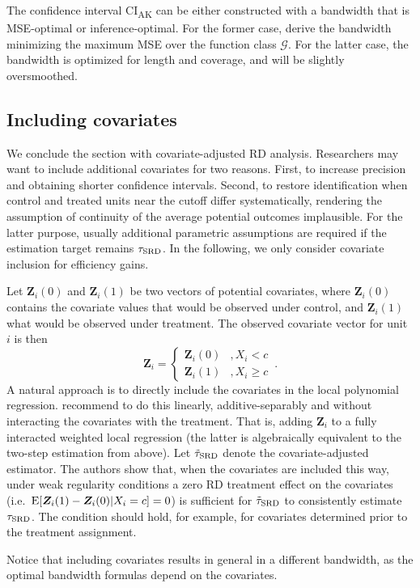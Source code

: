 The confidence interval CI\textsubscript{AK} can be either constructed with a bandwidth that is MSE-optimal or inference-optimal.
For the former case, \textcite{Armstrong_2020} derive the bandwidth minimizing the maximum MSE over the function class $\mathcal{G}$.
For the latter case, the bandwidth is optimized for length and coverage, and will be slightly oversmoothed.

\subsection{Including covariates}

We conclude the section with covariate-adjusted RD analysis.
Researchers may want to include additional covariates for two reasons.
First, to increase precision and obtaining shorter confidence intervals.
Second, to restore identification when control and treated units near the cutoff differ systematically,
rendering the assumption of continuity of the average potential outcomes implausible.
For the latter purpose, usually additional parametric assumptions are required if the estimation target remains $\tau_{\textup{SRD}}$.
In the following, we only consider covariate inclusion for efficiency gains.

Let $\bm{Z}_i(0)$ and $\bm{Z}_i(1)$ be two vectors of potential covariates,
where $\bm{Z}_i(0)$ contains the covariate values that would be observed under control, and $\bm{Z}_i(1)$ what would be observed under treatment.
The observed covariate vector for unit $i$ is then
\begin{equation}
	\bm{Z}_i = \begin{cases} 
		\bm{Z}_i(0) & , X_i < c \\
		\bm{Z}_i(1) & , X_i \geq c
	\end{cases} \,.
\end{equation}
A natural approach is to directly include the covariates in the local polynomial regression.
\textcite{Calonico_2019} recommend to do this linearly, additive-separably and without interacting the covariates with the treatment.
That is, adding $\bm{Z}_i$ to a fully interacted weighted local regression
(the latter is algebraically equivalent to the two-step estimation from above).
Let $\tilde{\tau}_{\textup{SRD}}$ denote the covariate-adjusted estimator.
The authors show that, when the covariates are included this way,
under weak regularity conditions a zero RD treatment effect on the covariates (i.e.\ $\operatorname{E}[\bm{Z}_i(1)-\bm{Z}_i(0) | X_i=c] = 0$)
is sufficient for $\tilde{\tau}_{\textup{SRD}}$ to consistently estimate $\tau_{\textup{SRD}}$.
The condition should hold, for example, for covariates determined prior to the treatment assignment.

Notice that including covariates results in general in a different bandwidth, as the optimal bandwidth formulas depend on the covariates.